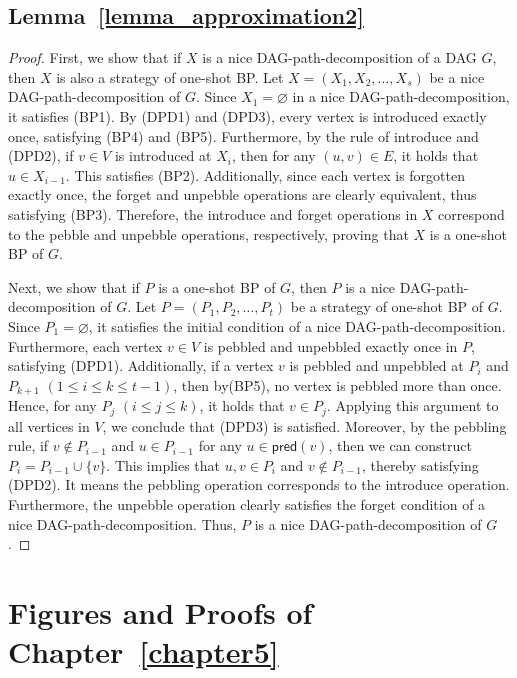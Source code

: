 \documentclass[runningheads]{llncs}
\theoremstyle{plain}
\theoremstyle{definition}
\begin{document}
\subsection{\textbf{Lemma~\ref{lemma_approximation2}}}\label{appendix_C1}
\begin{proof}
    First, we show that if $X$ is a nice DAG-path-decomposition of a DAG $G$, then $X$ is also a strategy of one-shot BP. Let $X=(X_1, X_2, \dots, X_s)$ be a nice DAG-path-decomposition of $G$. Since $X_1 = \varnothing$ in a nice DAG-path-decomposition, it satisfies (BP1). By (DPD1) and (DPD3), every vertex is introduced exactly once, satisfying (BP4) and (BP5). Furthermore, by the rule of introduce and (DPD2), if $v \in V$ is introduced at $X_i$, then for any $(u, v) \in E$, it holds that $u \in X_{i-1}$. This satisfies (BP2). Additionally, since each vertex is forgotten exactly once, the forget and unpebble operations are clearly equivalent, thus satisfying (BP3). Therefore, the introduce and forget operations in $X$ correspond to the pebble and unpebble operations, respectively, proving that $X$ is a one-shot BP of $G$.

    Next, we show that if $P$ is a one-shot BP of $G$, then $P$ is a nice DAG-path-decomposition of $G$. Let $P=(P_1, P_2, \dots, P_t)$ be a strategy of one-shot BP of $G$. Since $P_1 = \varnothing$, it satisfies the initial condition of a nice DAG-path-decomposition. Furthermore, each vertex $v \in V$ is pebbled and unpebbled exactly once in $P$, satisfying (DPD1). Additionally, if a vertex $v$ is pebbled and unpebbled at $P_i$ and $P_{k+1}$ $(1 \leq i \leq k \leq t-1)$, then by(BP5), no vertex is pebbled more than once. Hence, for any $P_j$ $(i \leq j \leq k)$, it holds that $v \in P_j$. Applying this argument to all vertices in $V$, we conclude that (DPD3) is satisfied. Moreover, by the pebbling rule, if $v \notin P_{i-1}$ and $u \in P_{i-1}$ for any $u \in \mathsf{pred}(v)$, then we can construct $P_i = P_{i-1} \cup \{v\}$. This implies that $u, v \in P_i$ and $v \notin P_{i-1}$, thereby satisfying (DPD2). It means the pebbling operation corresponds to the introduce operation. Furthermore, the unpebble operation clearly satisfies the forget condition of a nice DAG-path-decomposition. Thus, $P$ is a nice DAG-path-decomposition of $G$.
\end{proof}


\section{Figures and Proofs of Chapter~\ref{chapter5}}
\end{document}
